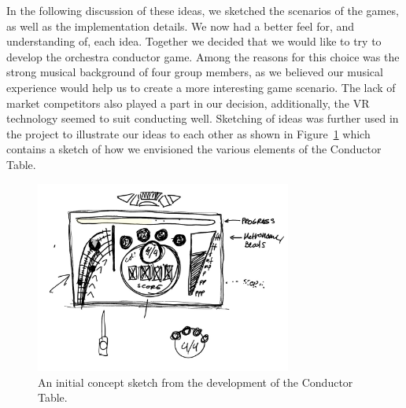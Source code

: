In the following discussion of these ideas, we sketched the scenarios of the games, as well as the implementation details. We now had a better feel for, and understanding of, each idea. Together we decided that we would like to try to develop the orchestra conductor game. Among the reasons for this choice was the strong musical background of four group members, as we believed our musical experience would help us to create a more interesting game scenario. The lack of market competitors also played a part in our decision, additionally, the VR technology seemed to suit conducting well. Sketching of ideas was further used in the project to illustrate our ideas to each other as shown in Figure~\ref{fig:tablesketch} which contains a sketch of how we envisioned the various elements of the Conductor Table. 

\begin{figure}[tbph]
    \centering
    \includegraphics[width=0.75\textwidth]{images/sketch.jpg}
    \caption[Example sketch of the Conductor Table]{An initial concept sketch from the development of the Conductor Table.}
    \label{fig:tablesketch}
\end{figure}

